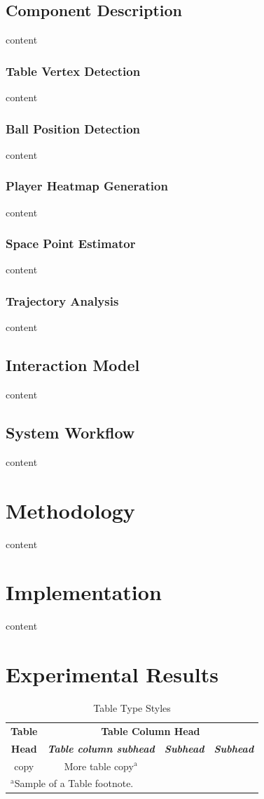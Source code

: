 \documentclass[conference]{IEEEtran}
\begin{document}
\subsection{Component Description}
content
\subsubsection{Table Vertex Detection}
content
\subsubsection{Ball Position Detection}
content
\subsubsection{Player Heatmap Generation}
content
\subsubsection{Space Point Estimator}
content
\subsubsection{Trajectory Analysis}
content
\subsection{Interaction Model}
content
\subsection{System Workflow}
content
\section{Methodology}
content
\section{Implementation}
content
\section{Experimental Results}
\begin{table}[htbp]
\caption{Table Type Styles}
\begin{center}
\begin{tabular}{|c|c|c|c|}
\hline
\textbf{Table}&\multicolumn{3}{|c|}{\textbf{Table Column Head}} \\
\cline{2-4} 
\textbf{Head} & \textbf{\textit{Table column subhead}}& \textbf{\textit{Subhead}}& \textbf{\textit{Subhead}} \\
\hline
copy& More table copy$^{\mathrm{a}}$& &  \\
\hline
\multicolumn{4}{l}{$^{\mathrm{a}}$Sample of a Table footnote.}
\end{tabular}
\label{tab1}
\end{center}
\end{table}
\end{document}
